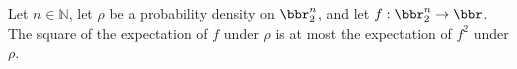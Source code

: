 \begin{theorem}
\label{FABL.ProbabilityDensity.sq_expectation_le_expectation_sq}
\leanok
{}
Let $n\in\mathbb N$, let $\rho$ be a probability density on $\bbr_2^n$, and let
$f:\bbr_2^n\to\bbr$. The square of the expectation of $f$ under $\rho$ is at most the
expectation of $f^2$ under $\rho$.
\end{theorem}
